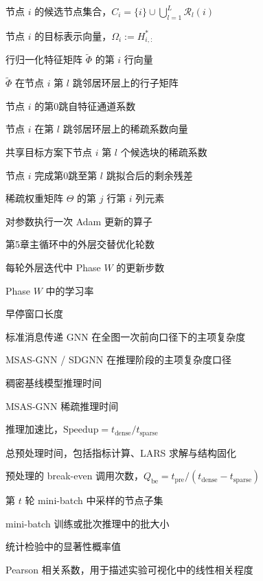 \begin{denotation}[4.0cm]
  \item[$C_i$] 节点 $i$ 的候选节点集合，$C_i=\{i\}\cup \bigcup_{l=1}^{L}\mathcal{R}_l(i)$
  \item[$\Omega_i$] 节点 $i$ 的目标表示向量，$\Omega_i:=H_{i,:}^{*}$
  \item[$\tilde{\phi}_i$] 行归一化特征矩阵 $\tilde{\Phi}$ 的第 $i$ 行向量
  \item[$\tilde{\Phi}_{\mathcal{R}_l(i)}$] $\tilde{\Phi}$ 在节点 $i$ 第 $l$ 跳邻居环层上的行子矩阵
  \item[$\theta_i^{(0)}$] 节点 $i$ 的第0跳自特征通道系数
  \item[$\theta_i^{(l)}$] 节点 $i$ 在第 $l$ 跳邻居环层上的稀疏系数向量
  \item[$\theta_{i,\mathrm{share}}^{(l)}$] 共享目标方案下节点 $i$ 第 $l$ 个候选块的稀疏系数
  \item[$r_i^{(l)}$] 节点 $i$ 完成第0跳至第 $l$ 跳拟合后的剩余残差
  \item[$\Theta_{j,i}$] 稀疏权重矩阵 $\Theta$ 的第 $j$ 行第 $i$ 列元素
  \item[$\operatorname{AdamStep}(\cdot)$] 对参数执行一次 Adam 更新的算子
  \item[$T_{\mathrm{epoch}}$] 第5章主循环中的外层交替优化轮数
  \item[$T_W$] 每轮外层迭代中 Phase $W$ 的更新步数
  \item[$\eta_W$] Phase $W$ 中的学习率
  \item[$q$] 早停窗口长度
  \item[$O(Lmd)$] 标准消息传递 GNN 在全图一次前向口径下的主项复杂度
  \item[$O(n\bar{k}d)$] MSAS-GNN / SDGNN 在推理阶段的主项复杂度口径

  \item[$t_{\mathrm{dense}}$] 稠密基线模型推理时间
  \item[$t_{\mathrm{sparse}}$] MSAS-GNN 稀疏推理时间
  \item[$\mathrm{Speedup}$] 推理加速比，$\mathrm{Speedup}=t_{\mathrm{dense}}/t_{\mathrm{sparse}}$
  \item[$t_{\mathrm{pre}}$] 总预处理时间，包括指标计算、LARS 求解与结构固化
  \item[$Q_{\mathrm{be}}$] 预处理的 break-even 调用次数，$Q_{\mathrm{be}}=t_{\mathrm{pre}}/(t_{\mathrm{dense}}-t_{\mathrm{sparse}})$
  \item[$B_t$] 第 $t$ 轮 mini-batch 中采样的节点子集
  \item[\texttt{batch\_size}] mini-batch 训练或批次推理中的批大小
  \item[$p$ 值] 统计检验中的显著性概率值
  \item[$r_{\mathrm{Pearson}}$] Pearson 相关系数，用于描述实验可视化中的线性相关程度

\end{denotation}